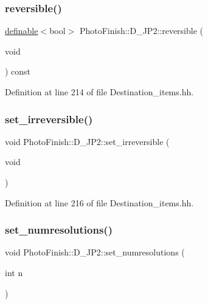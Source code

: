 \subsubsection{\texorpdfstring{reversible()}{reversible()}}
{\footnotesize\ttfamily \hyperlink{class_photo_finish_1_1definable}{definable}$<$bool$>$ Photo\+Finish\+::\+D\+\_\+\+J\+P2\+::reversible (\begin{DoxyParamCaption}\item[{void}]{ }\end{DoxyParamCaption}) const\hspace{0.3cm}{\ttfamily [inline]}}



Definition at line 214 of file Destination\+\_\+items.\+hh.

\mbox{\label{class_photo_finish_1_1_d___j_p2_a58af16eb399eab6cfcf69095c8afe6d5}} 
\subsubsection{\texorpdfstring{set\+\_\+irreversible()}{set\_irreversible()}}
{\footnotesize\ttfamily void Photo\+Finish\+::\+D\+\_\+\+J\+P2\+::set\+\_\+irreversible (\begin{DoxyParamCaption}\item[{void}]{ }\end{DoxyParamCaption})\hspace{0.3cm}{\ttfamily [inline]}}



Definition at line 216 of file Destination\+\_\+items.\+hh.

\mbox{\label{class_photo_finish_1_1_d___j_p2_a001a7b98c4a08077cf10cdd681a16527}} 
\subsubsection{\texorpdfstring{set\+\_\+numresolutions()}{set\_numresolutions()}}
{\footnotesize\ttfamily void Photo\+Finish\+::\+D\+\_\+\+J\+P2\+::set\+\_\+numresolutions (\begin{DoxyParamCaption}\item[{int}]{n }\end{DoxyParamCaption})\hspace{0.3cm}{\ttfamily [inline]}}



